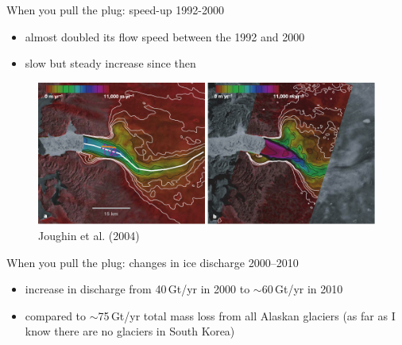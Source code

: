 \documentclass[hide notes,intlimits]{beamer}
\begin{document}
\begin{frame}{When you pull the plug: speed-up 1992-2000}
  \begin{itemize}
    \item almost doubled its flow speed between the 1992 and 2000
    \item slow but steady increase since then
  \end{itemize}
  \begin{figure}
    \includegraphics[width=\textwidth]{Joughin2004Fig2} \\
    \footnotesize{Joughin et al. (2004)}
  \end{figure}
\end{frame}


  {
}


\begin{frame}{When you pull the plug: changes in ice discharge 2000--2010}
  \begin{itemize}
  \item increase in discharge from 40\,Gt/yr in 2000 to $\sim$60\,Gt/yr in 2010
  \item compared to $\sim$75\,Gt/yr total mass loss from all Alaskan glaciers (as far as I know there are no glaciers in South Korea)
  \end{itemize}
\end{frame}
\end{document}
